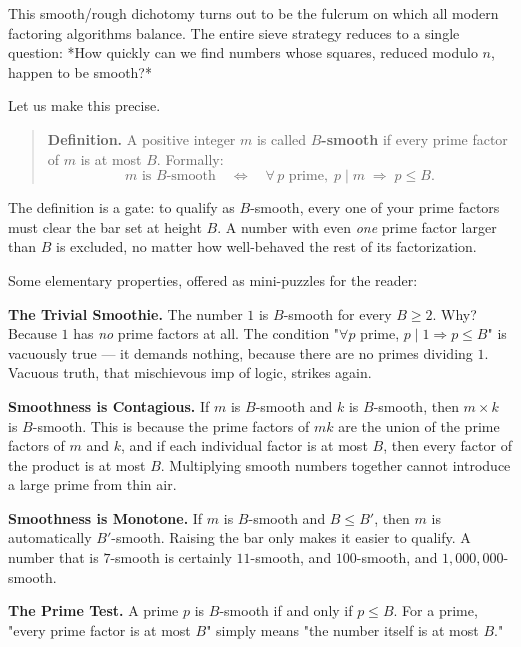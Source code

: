 \documentclass[11pt,openany]{book}
\theoremstyle{definition}
\theoremstyle{plain}
\theoremstyle{remark}
\begin{document}
This smooth/rough dichotomy turns out to be the fulcrum on which all modern factoring algorithms balance. The entire sieve strategy reduces to a single question: *How quickly can we find numbers whose squares, reduced modulo $n$, happen to be smooth?*

Let us make this precise.

\begin{quote}
\textbf{Definition.} A positive integer $m$ is called \textbf{$B$-smooth} if every prime factor of $m$ is at most $B$. Formally:
$$m \text{ is } B\text{-smooth} \quad\Longleftrightarrow\quad \forall\, p \text{ prime},\; p \mid m \;\Rightarrow\; p \leq B.$$
\end{quote}


The definition is a gate: to qualify as $B$-smooth, every one of your prime factors must clear the bar set at height $B$. A number with even \textit{one} prime factor larger than $B$ is excluded, no matter how well-behaved the rest of its factorization.

Some elementary properties, offered as mini-puzzles for the reader:

\textbf{The Trivial Smoothie.} The number $1$ is $B$-smooth for every $B \geq 2$. Why? Because $1$ has \textit{no} prime factors at all. The condition "$\forall p$ prime, $p \mid 1 \Rightarrow p \leq B$" is vacuously true — it demands nothing, because there are no primes dividing $1$. Vacuous truth, that mischievous imp of logic, strikes again.

\textbf{Smoothness is Contagious.} If $m$ is $B$-smooth and $k$ is $B$-smooth, then $m \times k$ is $B$-smooth. This is because the prime factors of $mk$ are the union of the prime factors of $m$ and $k$, and if each individual factor is at most $B$, then every factor of the product is at most $B$. Multiplying smooth numbers together cannot introduce a large prime from thin air.

\textbf{Smoothness is Monotone.} If $m$ is $B$-smooth and $B \leq B'$, then $m$ is automatically $B'$-smooth. Raising the bar only makes it easier to qualify. A number that is $7$-smooth is certainly $11$-smooth, and $100$-smooth, and $1{,}000{,}000$-smooth.

\textbf{The Prime Test.} A prime $p$ is $B$-smooth if and only if $p \leq B$. For a prime, "every prime factor is at most $B$" simply means "the number itself is at most $B$."
\end{document}
